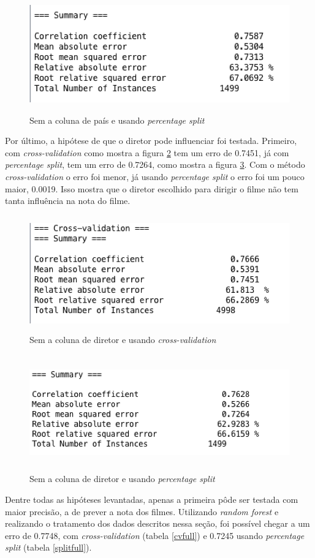 \begin{figure}[H]
\centering
\includegraphics[height=5cm]{imagens/no_country_split.png}
\caption{Sem a coluna de país e usando \textit{percentage split}}
\label{nocountrysplit}
\end{figure}


Por último, a hipótese de que o diretor pode influenciar foi testada. Primeiro, com \textit{cross-validation} como mostra a figura \ref{nodirectorcv} tem um erro de 0.7451, já com \textit{percentage split}, tem um erro de 0.7264, como mostra a figura \ref{nodirectorsplit}. Com o método \textit{cross-validation} o erro foi menor, já usando \textit{percentage split} o erro foi um pouco maior, 0.0019. Isso mostra que o diretor escolhido para dirigir o filme não tem tanta influência na nota do filme. 

\begin{figure}[H]
\centering
\includegraphics[height=5cm]{imagens/no_director_cv.png}
\caption{Sem a coluna de diretor e usando \textit{cross-validation}}
\label{nodirectorcv}
\end{figure}

\begin{figure}[H]
\centering
\includegraphics[height=5cm]{imagens/no_director_split.png}
\caption{Sem a coluna de diretor e usando \textit{percentage split}}
\label{nodirectorsplit}
\end{figure}

Dentre todas as hipóteses levantadas, apenas a primeira pôde ser testada com maior precisão, a de prever a nota dos filmes. Utilizando \textit{random forest} e realizando o tratamento dos dados descritos nessa seção, foi possível chegar a um erro de 0.7748, com \textit{cross-validation} (tabela \ref{cvfull}) e 0.7245 usando \textit{percentage split} (tabela \ref{splitfull}). 
